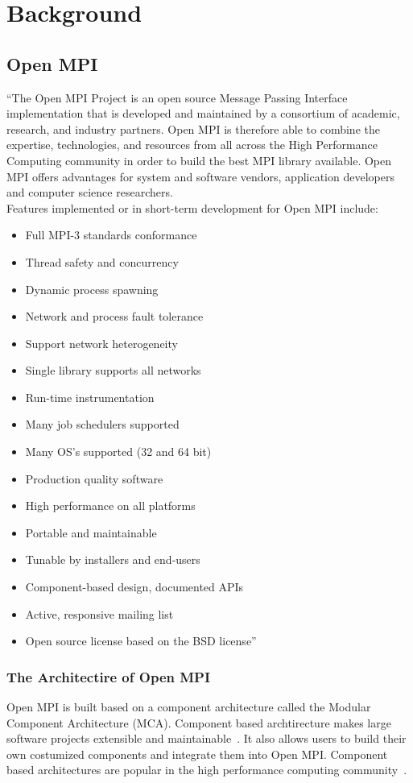 \chapter{Background}
\label{sec:Background}

\section{Open MPI}
\label{sec:openmpi}
``The Open MPI Project is an open source Message Passing Interface implementation that is developed and maintained by a consortium of academic, research, and industry partners. Open MPI is therefore able to combine the expertise, technologies, and resources from all across the High Performance Computing community in order to build the best MPI library available. Open MPI offers advantages for system and software vendors, application developers and computer science researchers.\\
Features implemented or in short-term development for Open MPI include:
\begin{itemize}
  \item Full MPI-3 standards conformance
  \item Thread safety and concurrency
  \item Dynamic process spawning
  \item Network and process fault tolerance
  \item Support network heterogeneity
  \item Single library supports all networks
  \item Run-time instrumentation
  \item Many job schedulers supported
  \item Many OS's supported (32 and 64 bit)
  \item Production quality software
  \item High performance on all platforms
  \item Portable and maintainable
  \item Tunable by installers and end-users
  \item Component-based design, documented APIs
  \item Active, responsive mailing list
  \item Open source license based on the BSD license''~\cite{openmpi}
\end{itemize}
    
\subsection{The Architectire of Open MPI}
Open MPI is built based on a component architecture called the Modular Component Architecture (MCA). Component based archtirecture makes large software projects extensible and maintainable~\cite{barrett2005analysis,graham2006open}. It also allows users to build their own costumized components and integrate them into Open MPI. Component based architectures are popular in the high performance computing community~\cite{squyres2003component,bernholdt2006component}.

